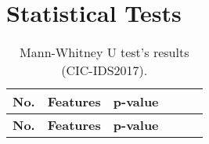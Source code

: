 \section{Statistical Tests}\label{appendix:statistical_tests}

\begin{center}
    \begin{longtable}{|l|l|l|l|l|l|}
        \caption{Mann-Whitney U test’s results (CIC-IDS2017).} \\

        \hline
        \textbf{No.} & \textbf{Features} & \textbf{p-value} \\
        \hline
        \endfirsthead

        \hline
        \textbf{No.} & \textbf{Features} & \textbf{p-value} \\
        \hline
        \endhead


\end{longtable}
\end{center}
